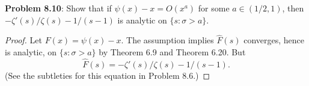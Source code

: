 \documentclass[12pt]{article}
\newcommand{\Fhat}{\widehat{F}}
\begin{document}
\fi

\textbf{Problem 8.10}: Show that if $\psi(x) - x = O(x^a)$ for some $a \in (1/2, 1)$, then $-\zeta'(s)/\zeta(s) - 1/(s - 1)$ is analytic on $\{s : \sigma > a\}$.

\begin{proof}
Let $F(x) = \psi(x) - x$. The assumption implies $\Fhat(s)$ converges, hence is analytic, on $\{s : \sigma > a\}$ by Theorem 6.9 and Theorem 6.20. But
$$\Fhat(s) = -\zeta'(s)/\zeta(s) - 1/(s - 1).$$
(See the subtleties for this equation in Problem 8.6.)
\end{proof}

\unless\ifdefined\IsMainDocument
\end{document}

